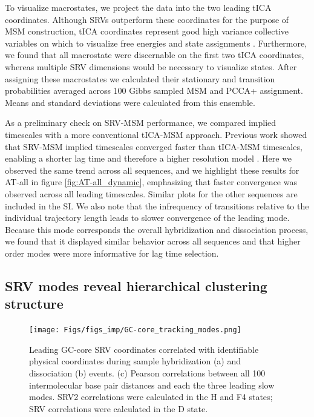\documentclass[journal=jpcbfk,manuscript=article]{achemso}
\begin{document}

To visualize macrostates, we project the data into the two leading tICA coordinates. Although SRVs outperform these coordinates for the purpose of MSM construction, tICA coordinates represent good high variance collective variables on which to visualize free energies and state assignments \citep{Sidky}. Furthermore, we found that all macrostate were discernable on the first two tICA coordinates, whereas multiple SRV dimensions would be necessary to visualize states. After assigning these macrostates we calculated their stationary and transition probabilities averaged across 100 Gibbs sampled MSM and PCCA+ assignment. Means and standard deviations were calculated from this ensemble.

As a preliminary check on SRV-MSM performance, we compared implied timescales with a more conventional tICA-MSM approach. Previous work showed that SRV-MSM implied timescales converged faster than tICA-MSM timescales, enabling a shorter lag time and therefore a higher resolution model \citep{Sidky}. Here we observed the same trend across all sequences, and we highlight these results for AT-all in figure \ref{fig:AT-all_dynamic}, emphasizing that faster convergence was observed across all leading timescales. Similar plots for the other sequences are included in the SI. We also note that the infrequency of transitions relative to the individual trajectory length leads to slower convergence of the leading mode. Because this mode corresponds the overall hybridization and dissociation process, we found that it displayed similar behavior across all sequences and that higher order modes were more informative for lag time selection.

\subsection{SRV modes reveal hierarchical clustering structure}  %

\begin{figure} %
	\begin{center}
        \texttt{[image: Figs/figs\_imp/GC-core\_tracking\_modes.png]}
        \caption{Leading GC-core SRV coordinates correlated with identifiable physical coordinates during sample hybridization (a) and dissociation (b) events. (c) Pearson correlations between all 100 intermolecular base pair distances and each the three leading slow modes. SRV2 correlations were calculated in the H and F4 states; SRV correlations were calculated in the D state.}
        \label{fig:GC-core_tracking_modes}
	\end{center}
\end{figure}    
\end{document}
